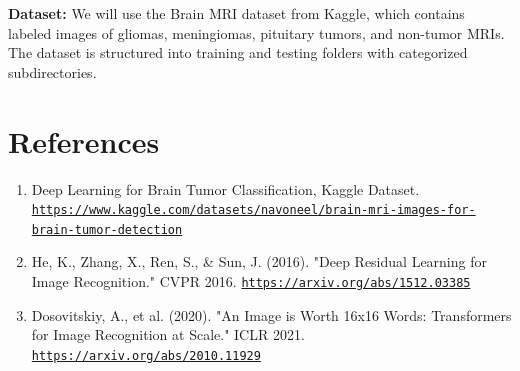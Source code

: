 \documentclass[10pt,twocolumn,letterpaper]{article}
\begin{document}
\textbf{Dataset:} We will use the Brain MRI dataset from Kaggle, which contains labeled images of gliomas, meningiomas, pituitary tumors, and non-tumor MRIs. The dataset is structured into training and testing folders with categorized subdirectories.





\section*{References}
\begin{enumerate}
    \item Deep Learning for Brain Tumor Classification, Kaggle Dataset.  
    \href{https://www.kaggle.com/datasets/navoneel/brain-mri-images-for-brain-tumor-detection}{\nolinkurl{https://www.kaggle.com/datasets/navoneel/brain-mri-images-for-brain-tumor-detection}}
    
    \item He, K., Zhang, X., Ren, S., & Sun, J. (2016). "Deep Residual Learning for Image Recognition." CVPR 2016.  
    \href{https://arxiv.org/abs/1512.03385}{\nolinkurl{https://arxiv.org/abs/1512.03385}}
    
    \item Dosovitskiy, A., et al. (2020). "An Image is Worth 16x16 Words: Transformers for Image Recognition at Scale." ICLR 2021.  
    \href{https://arxiv.org/abs/2010.11929}{\nolinkurl{https://arxiv.org/abs/2010.11929}}
\end{enumerate}
\end{document}
